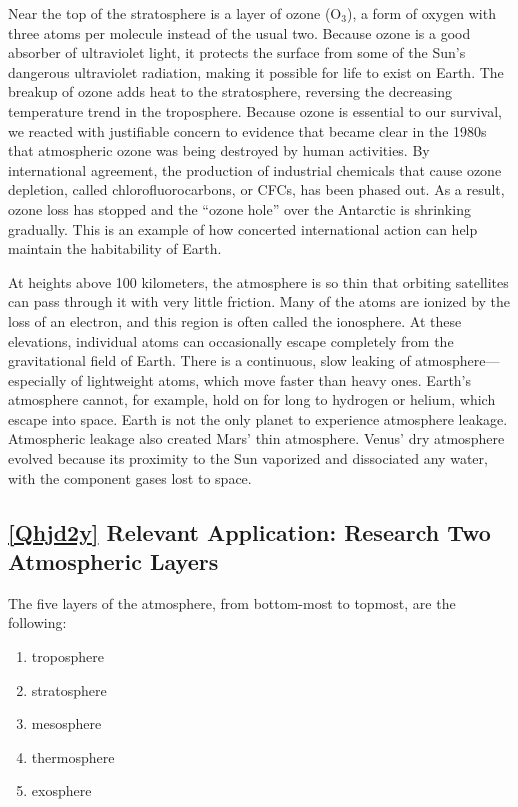\documentclass{article}
\numberwithin{equation}{section}
\numberwithin{figure}{section}
\begin{document}
\vspace{1em}

Near the top of the stratosphere is a layer of ozone ($\mathrm{O}_3$), a form of oxygen with three atoms per molecule instead of the usual two. Because ozone is a good absorber of ultraviolet light, it protects the surface from some of the Sun's dangerous ultraviolet radiation, making it possible for life to exist on Earth. The breakup of ozone adds heat to the stratosphere, reversing the decreasing temperature trend in the troposphere. Because ozone is essential to our survival, we reacted with justifiable concern to evidence that became clear in the 1980s that atmospheric ozone was being destroyed by human activities. By international agreement, the production of industrial chemicals that cause ozone depletion, called chlorofluorocarbons, or CFCs, has been phased out. As a result, ozone loss has stopped and the ``ozone hole'' over the Antarctic is shrinking gradually. This is an example of how concerted international action can help maintain the habitability of Earth.

\vspace{1em}

At heights above 100 kilometers, the atmosphere is so thin that orbiting satellites can pass through it with very little friction. Many of the atoms are ionized by the loss of an electron, and this region is often called the ionosphere. At these elevations, individual atoms can occasionally escape completely from the gravitational field of Earth. There is a continuous, slow leaking of atmosphere---especially of lightweight atoms, which move faster than heavy ones. Earth's atmosphere cannot, for example, hold on for long to hydrogen or helium, which escape into space. Earth is not the only planet to experience atmosphere leakage. Atmospheric leakage also created Mars' thin atmosphere. Venus' dry atmosphere evolved because its proximity to the Sun vaporized and dissociated any water, with the component gases lost to space.

\clearpage
\subsection*{\ref{Qhjd2y} Relevant Application: Research Two Atmospheric Layers}
The five layers of the atmosphere, from bottom-most to topmost, are the following:

\begin{enumerate}
    \item troposphere
    \item stratosphere
    \item mesosphere
    \item thermosphere
    \item exosphere
\end{enumerate}
\end{document}
